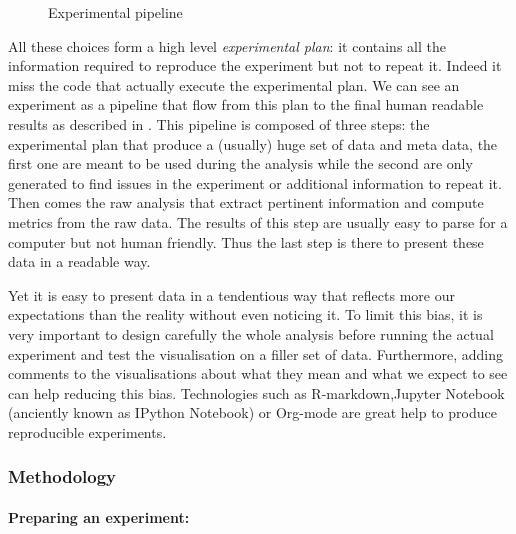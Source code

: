 \begin{figure}[htb]
    \centering
    
    \caption{Experimental pipeline}
    \label{fig:exp-pipeline}
\end{figure}

All these choices form a high level \emph{experimental plan}: it contains all the information required to reproduce the experiment but not to repeat it.
Indeed it miss the code that actually execute the experimental plan.
We can see an experiment as a pipeline that flow from this plan to the final human readable results as described in .
This pipeline is composed of three steps: the experimental plan that produce a (usually) huge set of data and meta data, the first one are meant to be used during the analysis while the second are only generated to find issues in the experiment or additional information to repeat it.
Then comes the raw analysis that extract pertinent information and compute metrics from the raw data.
The results of this step are usually easy to parse for a computer but not human friendly.
Thus the last step is there to present these data in a readable way.

Yet it is easy to present data in a tendentious way that reflects more our expectations than the reality without even noticing it.
To limit this bias, it is very important to design carefully the whole analysis before running the actual experiment and test the visualisation on a filler set of data.
Furthermore, adding comments to the visualisations about what they mean and what we expect to see can help reducing this bias.
Technologies such as \gls{R-markdown},Jupyter Notebook (anciently known as IPython Notebook) or \gls{Org-mode} are great help to produce reproducible experiments.

\subsubsection{Methodology}

\paragraph{Preparing an experiment:}

